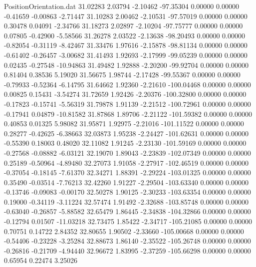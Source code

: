 \begin{filecontents}{PositionOrientation.dat}
  31.02283    2.03794   -2.10462   -97.35304    0.00000    0.00000   -0.41659   -0.00863   -2.71447
  31.10283    2.00462   -2.10531   -97.57019    0.00000    0.00000    0.30478    0.04091   -2.34766
  31.18273    2.02897   -2.10204   -97.75777    0.00000    0.00000    0.07805   -0.42900   -5.58566
  31.26278    2.03522   -2.13638   -98.20493    0.00000    0.00000   -0.82054   -0.31119   -8.42467
  31.33476    1.97616   -2.15878   -98.81134    0.00000    0.00000   -0.61402   -0.26457   -3.00682
  31.41493    1.92693   -2.17999   -99.05239    0.00000    0.00000    0.02435   -0.27548  -10.94863
  31.49482    1.92888   -2.20200   -99.92704    0.00000    0.00000    0.81404    0.38536    5.19020
  31.56675    1.98744   -2.17428   -99.55367    0.00000    0.00000   -0.79933   -0.52364   -6.14795
  31.64662    1.92360   -2.21610  -100.04468    0.00000    0.00000    0.00825    0.15431   -3.54274
  31.72659    1.92426   -2.20376  -100.32800    0.00000    0.00000   -0.17823   -0.15741   -5.56319
  31.79878    1.91139   -2.21512  -100.72961    0.00000    0.00000   -0.17941    0.04879  -10.81582
  31.87868    1.89706   -2.21122  -101.59382    0.00000    0.00000    0.40853    0.01325    5.98082
  31.95871    1.92975   -2.21016  -101.11522    0.00000    0.00000    0.28277   -0.42625   -6.38663
  32.03873    1.95238   -2.24427  -101.62631    0.00000    0.00000   -0.55390    0.18003    0.48020
  32.11082    1.91245   -2.23130  -101.59169    0.00000    0.00000   -0.27568   -0.08882   -6.03121
  32.19070    1.89043   -2.23839  -102.07349    0.00000    0.00000    0.25189   -0.50964   -4.89480
  32.27073    1.91058   -2.27917  -102.46519    0.00000    0.00000   -0.37054   -0.18145   -7.61370
  32.34271    1.88391   -2.29224  -103.01325    0.00000    0.00000    0.35490   -0.03514   -7.76213
  32.42260    1.91227   -2.29504  -103.63340    0.00000    0.00000   -0.13746   -0.09083   -0.00170
  32.50278    1.90125   -2.30233  -103.63354    0.00000    0.00000    0.19000   -0.34119   -3.11224
  32.57474    1.91492   -2.32688  -103.85748    0.00000    0.00000   -0.63040   -0.26857   -5.88582
  32.65479    1.86445   -2.34838  -104.32866    0.00000    0.00000   -0.12794    0.01507  -11.03218
  32.73475    1.85422   -2.34717  -105.21085    0.00000    0.00000    0.70751    0.14722    2.84352
  32.80655    1.90502   -2.33660  -105.00668    0.00000    0.00000   -0.54406   -0.23228   -3.25284
  32.88673    1.86140   -2.35522  -105.26748    0.00000    0.00000   -0.26816   -0.21709   -4.94440
  32.96672    1.83995   -2.37259  -105.66298    0.00000    0.00000    0.65954    0.22474    3.25026

\end{filecontents}
